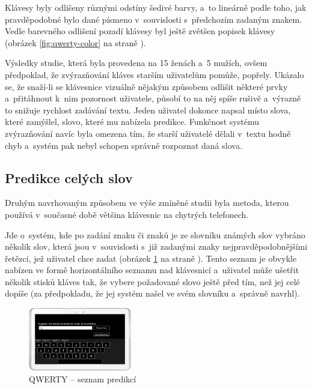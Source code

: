 \documentclass[a4paper,11pt,openany]{book} %
\begin{document}
Klávesy byly odlišeny různými odstíny šedivé barvy, a~to lineárně podle toho, jak pravděpodobné bylo dané písmeno v~souvislosti s~předchozím zadaným znakem. Vedle barevného odlišení pozadí klávesy byl ještě zvětšen popisek klávesy (obrázek \ref{fig:qwerty-color} na straně \pageref{fig:qwerty-color}). 

Výsledky studie, která byla provedena na 15 ženách a~5 mužích, ovšem předpoklad, že zvýrazňování kláves starším uživatelům pomůže, popřely. Ukázalo se, že snaží-li se klávesnice vizuálně nějakým způsobem odlišit některé prvky a~přitáhnout k~nim pozornost uživatele, působí to na něj spíše rušivě a~výrazně to snižuje rychlost zadávání textu. Jeden uživatel dokonce napsal místo slova, které zamýšlel, slovo, které mu nabízela predikce. Funkčnost systému zvýrazňování navíc byla omezena tím, že starší uživatelé dělali v~textu hodně chyb a~systém pak nebyl schopen správně rozpoznat daná slova.

\subsection{Predikce celých slov}

Druhým navrhovaným způsobem ve výše zmíněné studii byla metoda, kterou používá v~současné době většina klávesnic na chytrých telefonech.

Jde o~systém, kde po zadání znaku či znaků je ze slovníku známých slov vybráno několik slov, která jsou v~souvislosti s~již zadanými znaky nejpravděpodobnějšími řetězci, jež uživatel chce zadat (obrázek \ref{fig:qwerty-predict} na straně \pageref{fig:qwerty-predict}). Tento seznam je obvykle nabízen ve formě horizontálního seznamu nad klávesnicí a~uživatel může ušetřit několik stisků kláves tak, že vybere požadované slovo ještě před tím, než jej celé dopíše (za předpokladu, že jej systém našel ve svém slovníku a~správně navrhl). 

\begin{figure}[ht]
	\centering
	\includegraphics[width=0.4\textwidth]{qwerty_predict}
	\caption{QWERTY -- seznam predikcí}
	\label{fig:qwerty-predict}
\end{figure}
\end{document}
